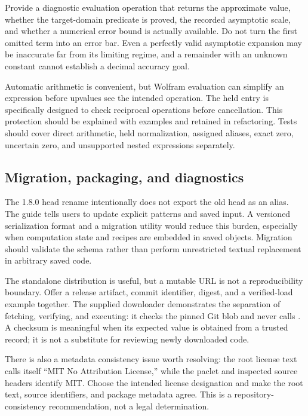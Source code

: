 \documentclass[11pt,a4paper]{article}
\newcommand{\code}[1]{\texttt{\detokenize{#1}}}
\begin{document}
Provide a diagnostic evaluation operation that returns the approximate value, whether the target-domain predicate is proved, the recorded asymptotic scale, and whether a numerical error bound is actually available. Do not turn the first omitted term into an error bar. Even a perfectly valid asymptotic expansion may be inaccurate far from its limiting regime, and a remainder with an unknown constant cannot establish a decimal accuracy goal.

Automatic arithmetic is convenient, but Wolfram evaluation can simplify an expression before upvalues see the intended operation. The held \code{SeriesNormalize} entry is specifically designed to check reciprocal operations before cancellation. This protection should be explained with examples and retained in refactoring. Tests should cover direct arithmetic, held normalization, assigned aliases, exact zero, uncertain zero, and unsupported nested expressions separately.\cite{arithmetic}

\subsection{Migration, packaging, and diagnostics}

The 1.8.0 head rename intentionally does not export the old head as an alias. The guide tells users to update explicit patterns and saved input. A versioned serialization format and a migration utility would reduce this burden, especially when computation state and recipes are embedded in saved objects. Migration should validate the schema rather than perform unrestricted textual replacement in arbitrary saved code.\cite{guide,validation}

The standalone distribution is useful, but a mutable \code{main} URL is not a reproducibility boundary. Offer a release artifact, commit identifier, digest, and a verified-load example together. The supplied downloader demonstrates the separation of fetching, verifying, and executing: it checks the pinned Git blob and never calls \code{Get}. A checksum is meaningful when its expected value is obtained from a trusted record; it is not a substitute for reviewing newly downloaded code.\cite{standalone,development}

There is also a metadata consistency issue worth resolving: the root license text calls itself ``MIT No Attribution License,'' while the paclet and inspected source headers identify MIT. Choose the intended license designation and make the root text, source identifiers, and package metadata agree. This is a repository-consistency recommendation, not a legal determination.\cite{license,paclet,core}
\end{document}
